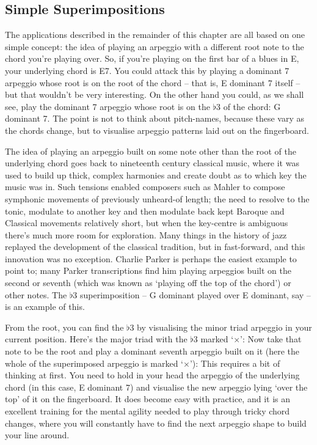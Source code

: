 \documentclass[english]{./gbook}
\begin{document}
\begin{large}
\section{Simple Superimpositions}

The applications described in the remainder of this chapter are all based on one simple concept: the idea of playing an arpeggio with a different root note to the chord you're playing over. So, if you're playing on the first bar of a blues in E, your underlying chord is E7. You could attack this by playing a dominant 7 arpeggio whose root is on the root of the chord -- that is, E dominant 7 itself -- but that wouldn't be very interesting. On the other hand you could, as we shall see, play the dominant 7 arpeggio whose root is on the $\flat$3 of the chord: G dominant 7. The point is not to think about pitch-names, because these vary as the chords change, but to visualise arpeggio patterns laid out on the fingerboard. 

The idea of playing an arpeggio built on some note other than the root of the underlying chord goes back to nineteenth century classical music, where it was used to build up thick, complex harmonies and create doubt as to which key the music was in. Such tensions enabled composers such as Mahler to compose symphonic movements of previously unheard-of length; the need to resolve to the tonic, modulate to another key and then modulate back kept Baroque and Classical movements relatively short, but when the key-centre is ambiguous there's much more room for exploration. Many things in the history of jazz replayed the development of the classical tradition, but in fast-forward, and this innovation was no exception. Charlie Parker is perhaps the easiest example to point to; many Parker transcriptions find him playing arpeggios built on the second or seventh (which was known as `playing off the top of the chord') or other notes. The $\flat$3 superimposition -- G dominant played over E dominant, say -- is an example of this.

From the root, you can find the $\flat$3 by visualising the minor triad arpeggio in your current position. Here's the major triad with the $\flat3$ marked `$\times$':
Now take that note to be the root and play a dominant seventh arpeggio built on it (here the whole of the superimposed arpeggio is marked `$\times$'):
This requires a bit of thinking at first. You need to hold in your head the arpeggio of the underlying chord (in this case, E dominant 7) and visualise the new arpeggio lying `over the top' of it on the fingerboard. It does become easy with practice, and it is an excellent training for the mental agility needed to play through tricky chord changes, where you will constantly have to find the next arpeggio shape to build your line around.


\end{large}
\end{document}
